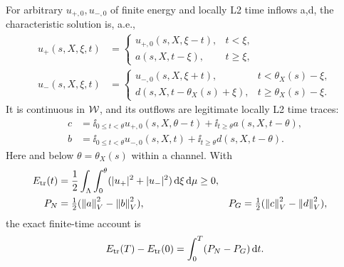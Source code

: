 \begin{lemma}\label{lem:transport}
For arbitrary $u_{+,0},u_{-,0}$ of finite energy and locally L2 time inflows a,d, the characteristic solution is, a.e.,
\begin{align}
u_+(s,X,\xi,t)&=\begin{cases}
u_{+,0}(s,X,\xi-t),&t<\xi,\\a(s,X,t-\xi),&t\ge\xi,
\end{cases}\label{eq:charplus}\\
u_-(s,X,\xi,t)&=\begin{cases}
u_{-,0}(s,X,\xi+t),&t<\theta_X(s)-\xi,\\
d(s,X,t-\theta_X(s)+\xi),&t\ge\theta_X(s)-\xi.
\end{cases}\label{eq:charminus}
\end{align}
It is continuous in $\mathcal W$, and its outflows are legitimate locally L2 time traces:
\begin{align}
c&=\ii_{0\le t<\theta}u_{+,0}(s,X,\theta-t)+\ii_{t\ge\theta}a(s,X,t-\theta),\label{eq:cstartup}\\
b&=\ii_{0\le t<\theta}u_{-,0}(s,X,t)+\ii_{t\ge\theta}d(s,X,t-\theta).\label{eq:bstartup}
\end{align}
Here and below $\theta=\theta_X(s)$ within a channel. With
\begin{align}
E_{\rm tr}(t)&=\frac12\int_\Lambda\int_0^\theta(|u_+|^2+|u_-|^2)\,\mathrm d\xi\,\mathrm d\mu\ge0,\label{eq:Etr}\\
P_N&=\tfrac12(\left\lVert a\right\rVert_V^2-\left\lVert b\right\rVert_V^2),&
P_G&=\tfrac12(\left\lVert c\right\rVert_V^2-\left\lVert d\right\rVert_V^2),\label{eq:portpowers}
\end{align}
the exact finite-time account is
\begin{equation}\label{eq:linebalance}
E_{\rm tr}(T)-E_{\rm tr}(0)=\int_0^T(P_N-P_G)\,\mathrm d t.
\end{equation}
\end{lemma}
